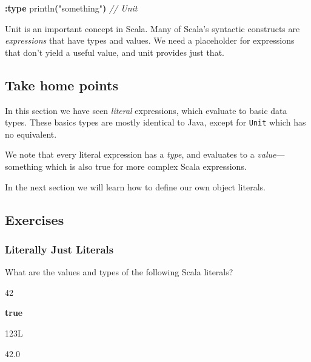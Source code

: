 \documentclass[11pt,a5paper,]{book}
\newenvironment{Shaded}{\begin{snugshade}}{\end{snugshade}}
\newcommand{\CommentTok}[1]{\textcolor[rgb]{0.56,0.35,0.01}{\textit{#1}}}
\newcommand{\DecValTok}[1]{\textcolor[rgb]{0.00,0.00,0.81}{#1}}
\newcommand{\FloatTok}[1]{\textcolor[rgb]{0.00,0.00,0.81}{#1}}
\newcommand{\FunctionTok}[1]{\textcolor[rgb]{0.00,0.00,0.00}{#1}}
\newcommand{\KeywordTok}[1]{\textcolor[rgb]{0.13,0.29,0.53}{\textbf{#1}}}
\newcommand{\NormalTok}[1]{#1}
\newcommand{\OperatorTok}[1]{\textcolor[rgb]{0.81,0.36,0.00}{\textbf{#1}}}
\newcommand{\StringTok}[1]{\textcolor[rgb]{0.31,0.60,0.02}{#1}}
\begin{document}
\begin{Shaded}
\begin{Highlighting}[]
\OperatorTok{:}\KeywordTok{type} \FunctionTok{println}\OperatorTok{(}\StringTok{"something"}\OperatorTok{)}
\CommentTok{// Unit}
\end{Highlighting}
\end{Shaded}

Unit is an important concept in Scala. Many of Scala's syntactic
constructs are \emph{expressions} that have types and values. We need a
placeholder for expressions that don't yield a useful value, and unit
provides just that.

\hypertarget{take-home-points-2}{%
\subsection{Take home points}\label{take-home-points-2}}

In this section we have seen \emph{literal} expressions, which evaluate
to basic data types. These basics types are mostly identical to Java,
except for \texttt{Unit} which has no equivalent.

We note that every literal expression has a \emph{type}, and evaluates
to a \emph{value}---something which is also true for more complex Scala
expressions.

In the next section we will learn how to define our own object literals.

\hypertarget{exercises-2}{%
\subsection{Exercises}\label{exercises-2}}

\hypertarget{literally-just-literals}{%
\subsubsection{Literally Just Literals}\label{literally-just-literals}}

What are the values and types of the following Scala literals?

\begin{Shaded}
\begin{Highlighting}[]
\DecValTok{42}

\KeywordTok{true}

\NormalTok{123L}

\FloatTok{42.0}
\end{Highlighting}
\end{Shaded}
\end{document}
